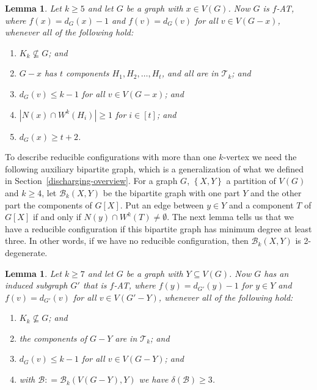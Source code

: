 \documentclass[12pt]{article}
\theoremstyle{plain}
\newtheorem{lem}[thm]{Lemma}
\theoremstyle{definition}
\theoremstyle{remark}
\newcommand{\fancy}[1]{\mathcal{#1}}
\newcommand{\T}{\fancy{T}}
\newcommand{\B}{\fancy{B}}
\newcommand{\set}[1]{\left\{ #1 \right\}}
\newcommand{\card}[1]{\left|#1\right|}
\newcommand{\irange}[1]{\left[#1\right]}
\newcommand{\DefinedAs}{\mathrel{\mathop:}=}
\begin{document}
\begin{lem}\label{ConfigurationTypeOneEuler}
Let $k \ge 5$ and let $G$ be a graph with $x \in V(G)$.  
Now $G$ is $f$-AT,
where $f(x) = d_G(x) - 1$ and $f(v) = d_G(v)$ for all $v \in V(G - x)$,
whenever all of the following hold:
\begin{enumerate}
\item[(1)] $K_k \not \subseteq G$; and
\item[(2)] $G-x$ has $t$ components $H_1, H_2, \ldots, H_t$, and all are in $\T_k$; and
\item[(3)] $d_G(v) \leq k - 1$ for all $v \in V(G-x)$; and
\item[(4)] $\card{N(x) \cap W^k(H_i)} \ge 1$ for $i \in \irange{t}$; and
\item[(5)] $d_G(x) \ge t+2$.
\end{enumerate}

\end{lem}

To describe reducible configurations with more than one $k$-vertex we need the
following auxiliary bipartite graph, which is a generalization of what we
defined in Section~\ref{discharging-overview}.  For a graph $G$, $\set{X, Y}$ a
partition of $V(G)$ and $k
\ge 4$, let $\B_k(X, Y)$ be the bipartite graph with one part $Y$ and the other
part the components of $G[X]$.  Put an edge between $y \in Y$ and a component
$T$ of $G[X]$ if and only if $N(y) \cap W^k(T) \ne \emptyset$.   The next lemma
tells us that we have a reducible configuration if this bipartite graph has
minimum degree at least three.  In other words, if we have no reducible
configuration, then $\B_k(X,Y)$ is 2-degenerate.

\begin{lem}
\label{MultipleHighConfigurationEuler} 
Let $k\ge7$ and let $G$ be a graph with $Y\subseteq V(G)$.  Now $G$ has an
induced subgraph $G'$ that is $f$-AT, where $f(y)=d_{G'}(y)-1$ for $y\in Y$ and
$f(v)=d_{G'}(v)$ for all $v\in V(G'-Y)$, whenever all of the following hold:
	\begin{enumerate}
	\item[(1)] $K_{k}\not\subseteq G$; and 
	\item[(2)] the components of $G-Y$ are in $\T_{k}$; and 
	\item[(3)] $d_{G}(v)\leq k-1$ for all $v\in V(G-Y)$; and 
	\item[(4)] with $\B\DefinedAs\B_{k}(V(G-Y),Y)$ we have $\delta(\B)\ge3$. 
	\end{enumerate}
\end{lem}
\end{document}
